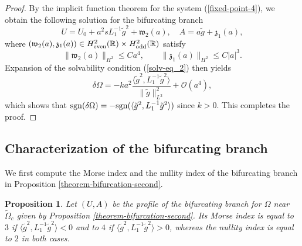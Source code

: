 \documentclass[12pt,reqno]{amsart}
\numberwithin{equation}{section}
\newtheorem{proposition}{Proposition}
\begin{document}
\begin{proof}
By the implicit function theorem for the system (\ref{fixed-point-4}), we obtain the following solution for the bifurcating branch 
\[
U = U_0 + a^2 s L_1^{-1} \tilde{g}^2 + \mathfrak{w}_2(a), \quad 
A = a \tilde{g} + \mathfrak{z}_1(a),
\]
where $(\mathfrak{w}_2(a), \mathfrak{z}_1(a)) \in H^2_{\rm even}(\mathbb{R}) \times H^2_{\rm odd}(\mathbb{R})$ satisfy 
\begin{equation*}
\| \mathfrak{w}_2(a) \|_{H^2} \leq C a^4, \qquad \| \mathfrak{z}_1(a) \|_{H^2} \leq C |a|^3.
\end{equation*}
Expansion of the solvability condition (\ref{solv-eq_2}) then yields
\begin{equation*}
\delta \Omega = - k a^2  \frac{\langle \tilde{g}^2, L_1^{-1} \tilde{g}^2 \rangle}{\| \tilde{g} \|^2_{L^2}} + \mathcal{O}(a^4),
\end{equation*}
which shows that ${\rm sgn}(\delta \Omega) = -{\rm sgn}(\langle \tilde{g}^2, L_1^{-1} \tilde{g}^2 \rangle)$ since $k > 0$. This completes the proof.
\end{proof}

\subsection{Characterization of the bifurcating branch}

We first compute the Morse index and the nullity index of the bifurcating branch in Proposition \ref{theorem-bifurcation-second}. 

\begin{proposition}
    \label{theorem-Morse-second}
    Let $(U,A)$ be the profile of the bifurcating branch for $\Omega$ near $\widetilde{\Omega}_c$ given by Proposition \ref{theorem-bifurcation-second}. 
   Its Morse index is equal to $3$ if $\langle \tilde{g}^2, L_1^{-1} \tilde{g}^2 \rangle < 0$ and to $4$ if $\langle \tilde{g}^2, L_1^{-1} \tilde{g}^2 \rangle > 0$, whereas the nullity index is equal to $2$ in both cases. 
\end{proposition}
\end{document}
